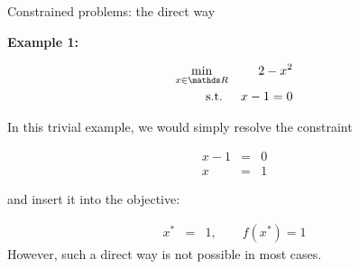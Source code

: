 \begin{vbframe}{Constrained problems: the direct way}

\textbf{Example 1:}

\begin{footnotesize}
\begin{eqnarray*}
\min_{x\in \R} && 2 - x^2 \\
\text{s.t. } && x - 1 = 0
\end{eqnarray*}
\end{footnotesize}

In this trivial example, we would simply resolve the constraint 

\begin{eqnarray*}
x - 1 &=& 0 \\
x &=& 1
\end{eqnarray*}

and insert it into the objective: 

\vspace*{-0.5cm}

\begin{eqnarray*}
x^\ast &=& 1, \qquad f(x^\ast) = 1
\end{eqnarray*}
However, such a direct way is not possible in most cases. 











\end{vbframe}
